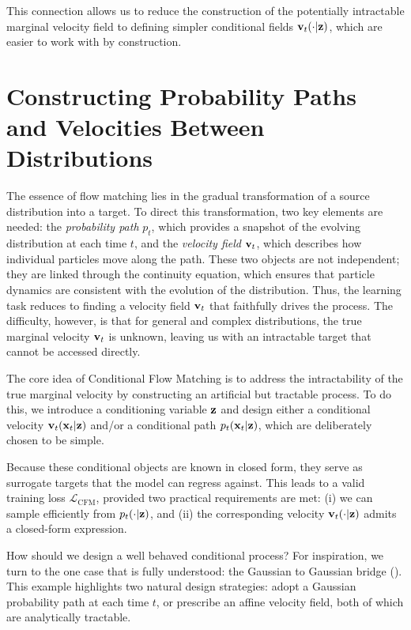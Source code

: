 This connection allows us to reduce the construction of the potentially intractable marginal velocity field to defining simpler conditional fields ${\mathbf{v}}_t(\cdot| {\mathbf{z}})$, which are easier to work with by construction.




\newpage

\section{Constructing Probability Paths and Velocities Between Distributions}\label{sec:instance-fm}

The essence of flow matching lies in the gradual transformation of a source distribution into a target. To direct this transformation, two key elements are needed: the \emph{probability path} $p_{t}$, which provides a snapshot of the evolving distribution at each time $t$, and the \emph{velocity field} ${\mathbf{v}}_{t}$, which describes how individual particles move along the path. These two objects are not independent; they are linked through the continuity equation, which ensures that particle dynamics are consistent with the evolution of the distribution. Thus, the learning task reduces to finding a velocity field ${\mathbf{v}}_t$ that faithfully drives the process. The difficulty, however, is that for general and complex distributions, the true marginal velocity ${\mathbf{v}}_t$ is unknown, leaving us with an intractable target that cannot be accessed directly. 

The core idea of Conditional Flow Matching is to address the intractability of the true marginal velocity by constructing an artificial but tractable process. To do this, we introduce a conditioning variable ${\mathbf{z}}$ and design either a conditional velocity ${\mathbf{v}}_t({\mathbf{x}}_t|{\mathbf{z}})$ and/or a conditional path $p_t({\mathbf{x}}_t|{\mathbf{z}})$, which are deliberately chosen to be simple.

 Because these conditional objects are known in closed form, they serve as surrogate targets that the model can regress against. This leads to a valid training loss $\mathcal{L}_{\mathrm{CFM}}$, provided two practical requirements are met: (i) we can sample efficiently from $p_t(\cdot|{\mathbf{z}})$, and (ii) the corresponding velocity ${\mathbf{v}}_t(\cdot|{\mathbf{z}})$ admits a closed-form expression. 


How should we design a well behaved conditional process? For inspiration, we turn to the one case that is fully understood: the Gaussian to Gaussian bridge (). This example highlights two natural design strategies: adopt a Gaussian probability path at each time $t$, or prescribe an affine velocity field, both of which are analytically tractable. 

